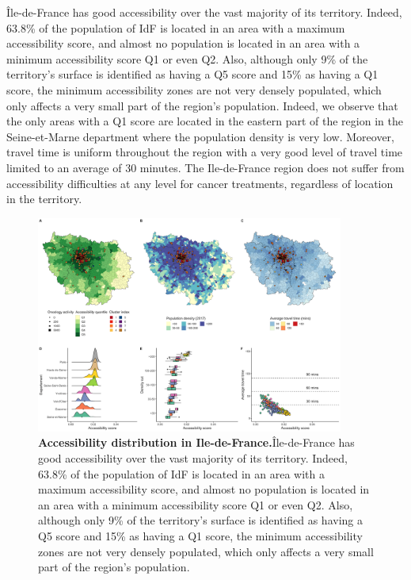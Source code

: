 Île-de-France has good accessibility over the vast majority of its territory.
Indeed, 63.8\% of the population of IdF is located in an area with a maximum
accessibility score, and almost no population is located in an area with a
minimum accessibility score Q1 or even Q2. Also, although only 9\% of the
territory's surface is identified as having a Q5 score and 15\% as having a Q1
score, the minimum accessibility zones are not very densely populated, which
only affects a very small part of the region's population. Indeed, we observe
that the only areas with a Q1 score are located in the eastern part of the
region in the Seine-et-Marne department where the population density is very
low. Moreover, travel time is uniform throughout the region with a very good
level of travel time limited to an average of 30 minutes. The Ile-de-France
region does not suffer from accessibility difficulties at any level for cancer
treatments, regardless of location in the territory.

\begin{figure}[h!]
    \includegraphics[width=0.9\textwidth]{images/camion/region_accessibility/accessibility_Ile-de-France.png}
    \centering
    \caption{
        \textbf{Accessibility distribution in Ile-de-France.}Île-de-France has good accessibility over the vast majority of its territory.
        Indeed, 63.8\% of the population of IdF is located in an area with a maximum
        accessibility score, and almost no population is located in an area with a
        minimum accessibility score Q1 or even Q2. Also, although only 9\% of the
        territory's surface is identified as having a Q5 score and 15\% as having a Q1
        score, the minimum accessibility zones are not very densely populated, which
        only affects a very small part of the region's population.
    }
\end{figure}

